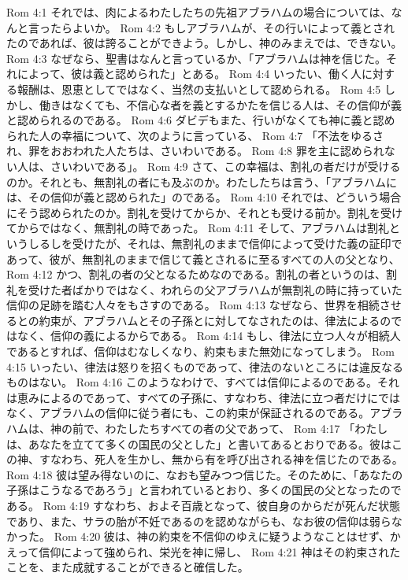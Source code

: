 Rom 4:1  それでは、肉によるわたしたちの先祖アブラハムの場合については、なんと言ったらよいか。
Rom 4:2  もしアブラハムが、その行いによって義とされたのであれば、彼は誇ることができよう。しかし、神のみまえでは、できない。
Rom 4:3  なぜなら、聖書はなんと言っているか、「アブラハムは神を信じた。それによって、彼は義と認められた」とある。
Rom 4:4  いったい、働く人に対する報酬は、恩恵としてではなく、当然の支払いとして認められる。
Rom 4:5  しかし、働きはなくても、不信心な者を義とするかたを信じる人は、その信仰が義と認められるのである。
Rom 4:6  ダビデもまた、行いがなくても神に義と認められた人の幸福について、次のように言っている、
Rom 4:7  「不法をゆるされ、罪をおおわれた人たちは、さいわいである。
Rom 4:8  罪を主に認められない人は、さいわいである」。
Rom 4:9  さて、この幸福は、割礼の者だけが受けるのか。それとも、無割礼の者にも及ぶのか。わたしたちは言う、「アブラハムには、その信仰が義と認められた」のである。
Rom 4:10  それでは、どういう場合にそう認められたのか。割礼を受けてからか、それとも受ける前か。割礼を受けてからではなく、無割礼の時であった。
Rom 4:11  そして、アブラハムは割礼というしるしを受けたが、それは、無割礼のままで信仰によって受けた義の証印であって、彼が、無割礼のままで信じて義とされるに至るすべての人の父となり、
Rom 4:12  かつ、割礼の者の父となるためなのである。割礼の者というのは、割礼を受けた者ばかりではなく、われらの父アブラハムが無割礼の時に持っていた信仰の足跡を踏む人々をもさすのである。
Rom 4:13  なぜなら、世界を相続させるとの約束が、アブラハムとその子孫とに対してなされたのは、律法によるのではなく、信仰の義によるからである。
Rom 4:14  もし、律法に立つ人々が相続人であるとすれば、信仰はむなしくなり、約束もまた無効になってしまう。
Rom 4:15  いったい、律法は怒りを招くものであって、律法のないところには違反なるものはない。
Rom 4:16  このようなわけで、すべては信仰によるのである。それは恵みによるのであって、すべての子孫に、すなわち、律法に立つ者だけにではなく、アブラハムの信仰に従う者にも、この約束が保証されるのである。アブラハムは、神の前で、わたしたちすべての者の父であって、
Rom 4:17  「わたしは、あなたを立てて多くの国民の父とした」と書いてあるとおりである。彼はこの神、すなわち、死人を生かし、無から有を呼び出される神を信じたのである。
Rom 4:18  彼は望み得ないのに、なおも望みつつ信じた。そのために、「あなたの子孫はこうなるであろう」と言われているとおり、多くの国民の父となったのである。
Rom 4:19  すなわち、およそ百歳となって、彼自身のからだが死んだ状態であり、また、サラの胎が不妊であるのを認めながらも、なお彼の信仰は弱らなかった。
Rom 4:20  彼は、神の約束を不信仰のゆえに疑うようなことはせず、かえって信仰によって強められ、栄光を神に帰し、
Rom 4:21  神はその約束されたことを、また成就することができると確信した。
